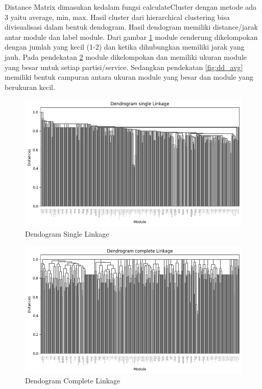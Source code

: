 Distance Matrix dimasukan kedalam fungsi calculateCluster dengan metode ada 3 yaitu average, min, max. Hasil cluster dari hierarchical clustering bisa divisualisasi dalam bentuk dendogram. Hasil dendogram memiliki distance/jarak antar module dan label module. Dari gambar \ref{fig:dd_single} module cenderung dikelompokan dengan jumlah yang kecil (1-2) dan ketika dihubungkan memiliki jarak yang jauh. Pada pendekatan \ref{fig:dd_complete} module dikelompokan dan memiliki ukuran module yang besar untuk setiap partisi/service. Sedangkan pendekatan \ref{fig:dd_avg} memiliki bentuk campuran antara ukuran module yang besar dan module yang berukuran kecil.

\begin{figure}[htbp]
	\centering
	\begin{minipage}{1\textwidth}
		\centering
		\includegraphics[width=1\textwidth]{img/bab_4/single_dd.png}
		\caption{Dendogram Single Linkage }
		\label{fig:dd_single}
	\end{minipage}\hfill	
\end{figure}

\begin{figure}[htbp]
	\centering
	\begin{minipage}{1\textwidth}
		\centering
		\includegraphics[width=1\textwidth]{img/bab_4/complete_dd.png}
		\caption{Dendogram Complete Linkage }
		\label{fig:dd_complete}
	\end{minipage}\hfill	
\end{figure}

